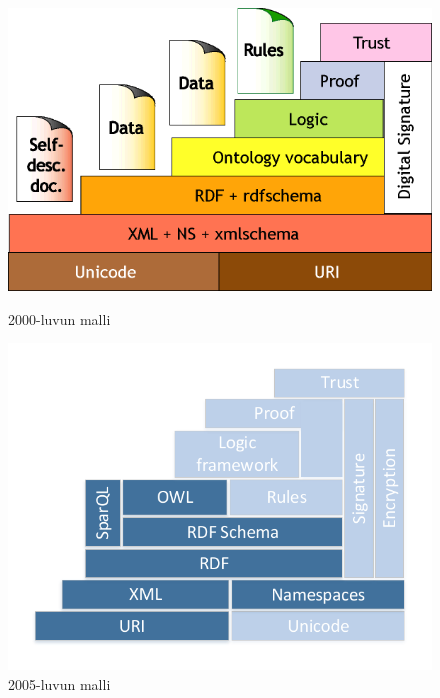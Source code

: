 \documentclass[finnish, 12pt, a4paper, elec, utf8, pdfa, online]{aaltothesis}
\begin{document}
{%
\begin{figure}[htb]
\begin{minipage}[b]{0.48\linewidth}
\includegraphics[width=\linewidth]{images/sweb-stack.png}
\caption{2000-luvun malli \cite{stack_bl} \label{images/sweb-stack.png}}
\end{minipage}
\hfill
\begin{minipage}[b]{0.48\linewidth}
\includegraphics[width=\linewidth]{images/sweb-stack2.pdf}
\caption{2005-luvun malli \cite{stack} \label{images/sweb-stack2.pdf}}
\end{minipage}%
\end{figure}




}
\end{document}
